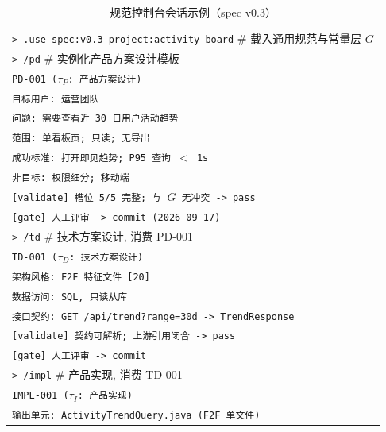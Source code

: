 \documentclass[11pt,a4paper]{ctexart}
\begin{document}
\begin{table}[htbp]
\centering
\caption{规范控制台会话示例（spec v0.3）}
\label{tab:console}
\small
\begin{tabular}{@{}l@{}}
\texttt{> .use spec:v0.3 project:activity-board} \quad \# 载入通用规范与常量层 $G$ \\[3pt]
\texttt{> /pd} \quad \# 实例化产品方案设计模板 \\
\texttt{PD-001 ($\tau_P$: 产品方案设计)} \\
\hspace*{2em}\texttt{目标用户: 运营团队} \\
\hspace*{2em}\texttt{问题: 需要查看近 30 日用户活动趋势} \\
\hspace*{2em}\texttt{范围: 单看板页; 只读; 无导出} \\
\hspace*{2em}\texttt{成功标准: 打开即见趋势; P95 查询 $<$ 1s} \\
\hspace*{2em}\texttt{非目标: 权限细分; 移动端} \\
\hspace*{2em}\texttt{[validate] 槽位 5/5 完整; 与 $G$ 无冲突 -> pass} \\
\hspace*{2em}\texttt{[gate] 人工评审 -> commit (2026-09-17)} \\[3pt]
\texttt{> /td} \quad \# 技术方案设计, 消费 PD-001 \\
\texttt{TD-001 ($\tau_D$: 技术方案设计)} \\
\hspace*{2em}\texttt{架构风格: F2F 特征文件 [20]} \\
\hspace*{2em}\texttt{数据访问: SQL, 只读从库} \\
\hspace*{2em}\texttt{接口契约: GET /api/trend?range=30d -> TrendResponse} \\
\hspace*{2em}\texttt{[validate] 契约可解析; 上游引用闭合 -> pass} \\
\hspace*{2em}\texttt{[gate] 人工评审 -> commit} \\[3pt]
\texttt{> /impl} \quad \# 产品实现, 消费 TD-001 \\
\texttt{IMPL-001 ($\tau_I$: 产品实现)} \\
\hspace*{2em}\texttt{输出单元: ActivityTrendQuery.java (F2F 单文件)} \\

\end{tabular}
\end{table}
\end{document}
